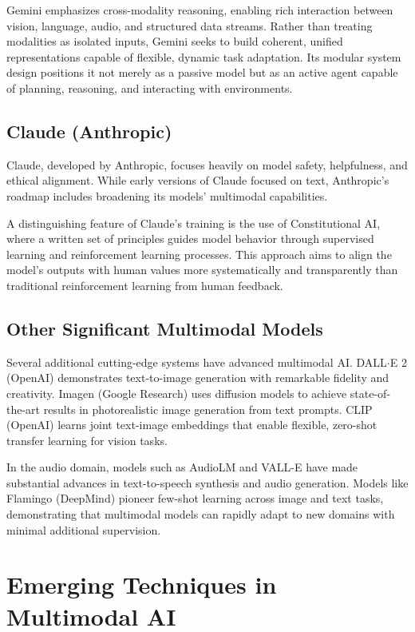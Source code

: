 \documentclass[openany]{book}
\begin{document}
Gemini emphasizes cross-modality reasoning, enabling rich interaction between 
vision, language, audio, and structured data streams. Rather than treating 
modalities as isolated inputs, Gemini seeks to build coherent, unified 
representations capable of flexible, dynamic task adaptation. Its modular system 
design positions it not merely as a passive model but as an active agent capable 
of planning, reasoning, and interacting with environments.

\subsection{Claude (Anthropic)}

Claude, developed by Anthropic, focuses heavily on model safety, helpfulness, and 
ethical alignment. While early versions of Claude focused on text, Anthropic’s 
roadmap includes broadening its models’ multimodal capabilities.

A distinguishing feature of Claude’s training is the use of Constitutional AI, 
where a written set of principles guides model behavior through supervised 
learning and reinforcement learning processes. This approach aims to align the 
model’s outputs with human values more systematically and transparently than 
traditional reinforcement learning from human feedback.

\subsection{Other Significant Multimodal Models}

Several additional cutting-edge systems have advanced multimodal AI. DALL$\cdot$E 2 
(OpenAI) demonstrates text-to-image generation with remarkable fidelity and 
creativity. Imagen (Google Research) uses diffusion models to achieve 
state-of-the-art results in photorealistic image generation from text prompts. CLIP 
(OpenAI) learns joint text-image embeddings that enable flexible, zero-shot 
transfer learning for vision tasks.

In the audio domain, models such as AudioLM and VALL-E have made substantial 
advances in text-to-speech synthesis and audio generation. Models like Flamingo 
(DeepMind) pioneer few-shot learning across image and text tasks, demonstrating 
that multimodal models can rapidly adapt to new domains with minimal additional 
supervision.

\section{Emerging Techniques in Multimodal AI}
\end{document}

